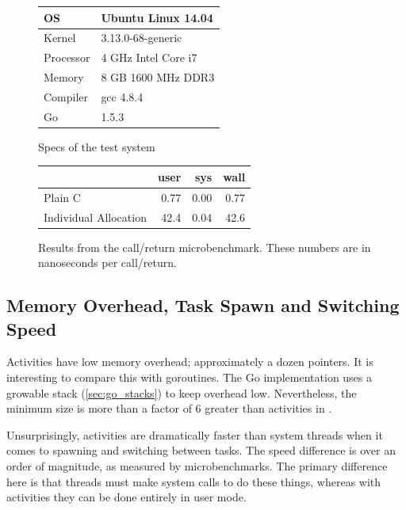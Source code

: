 \documentclass[acmsmall,anonymous,review]{acmart}\settopmatter{printfolios=true,printccs=false,printacmref=false}
\begin{document}
\begin{figure}
    \centering
    \begin{minipage}[t]{0.47\textwidth}
  \begin{tabular}{|l|l|}
    \hline
    OS & Ubuntu Linux 14.04 \\
    \hline
    Kernel & 3.13.0-68-generic \\
    \hline
    Processor & 4 GHz Intel Core i7 \\
    \hline
    Memory & 8 GB 1600 MHz DDR3 \\
    \hline
    Compiler & gcc 4.8.4 \\
    \hline
    Go & 1.5.3 \\
    \hline
  \end{tabular}
        \caption{Specs of the test system}
        \label{table:specs}
    \end{minipage}\hfill
    \begin{minipage}[t]{0.47\textwidth}

      \begin{tabular}{|l|r|r|r|}
  \hline
   & user & sys & wall \\
  \hline
  \hline
  Plain C & 0.77 & 0.00 & 0.77 \\
  \hline
  Individual Allocation & 42.4 & 0.04 & 42.6 \\
  \hline
\end{tabular}

      \caption{Results from the call/return microbenchmark.
      These numbers are in nanoseconds per call/return.}
        \label{fig:call_return_results}
    \end{minipage}
\end{figure}






\subsection{Memory Overhead, Task Spawn and Switching Speed}

Activities have low memory overhead; approximately a dozen pointers.
It is interesting to compare this with goroutines.
The Go implementation uses a growable stack (\textsection\ref{sec:go_stacks}) to keep overhead low.
Nevertheless, the minimum size is more than a factor of 6 greater than activities in \charcoal{}.

Unsurprisingly, activities are dramatically faster than system threads when it comes to spawning and switching between tasks.
The speed difference is over an order of magnitude, as measured by microbenchmarks.
The primary difference here is that threads must make system calls to do these things, whereas with activities they can be done entirely in user mode.
\end{document}
